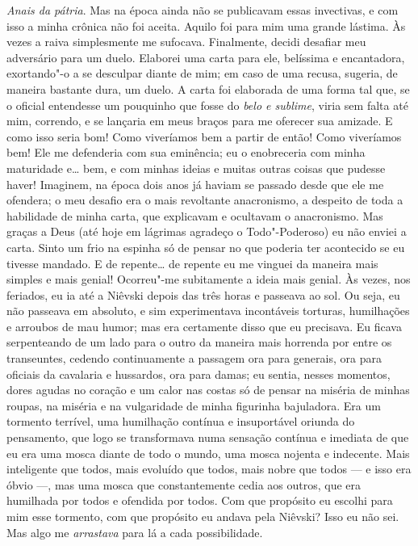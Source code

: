\textit{Anais da pátria}. Mas na época ainda não se publicavam essas
invectivas, e com isso a minha crônica não foi aceita.  Aquilo foi para mim uma
grande lástima. Às vezes a raiva simplesmente me sufocava. Finalmente, decidi
desafiar meu adversário para um duelo.  Elaborei uma carta para ele, belíssima
e encantadora, exortando"-o a se desculpar diante de mim; em caso de uma recusa,
sugeria, de maneira bastante dura, um duelo. A carta foi elaborada de uma forma
tal que, se o oficial entendesse um pouquinho que fosse do \textit{belo e sublime},
viria sem falta até mim, correndo, e se lançaria em meus braços para me
oferecer sua amizade. E como isso seria bom! Como viveríamos bem a partir de
então! Como viveríamos bem! Ele me defenderia com sua eminência; eu o
enobreceria com minha maturidade e\ldots{} bem, e com minhas ideias e muitas
outras coisas que pudesse haver! Imaginem, na época dois anos já haviam se
passado desde que ele me ofendera; o meu desafio era o mais revoltante
anacronismo, a despeito de toda a habilidade de minha carta, que explicavam e
ocultavam o anacronismo. Mas graças a Deus (até hoje em lágrimas agradeço o
Todo"-Poderoso) eu não enviei a carta. Sinto um frio na espinha só de pensar no
que poderia ter acontecido se eu tivesse mandado. E de repente\ldots{} de
repente eu me vinguei da maneira mais simples e mais genial! Ocorreu"-me
subitamente a ideia mais genial. Às vezes, nos feriados, eu ia até a Niêvski
depois das três horas e passeava ao sol. Ou seja, eu não passeava em absoluto,
e sim experimentava incontáveis torturas, humilhações e arroubos de mau humor;
mas era certamente disso que eu precisava. Eu ficava serpenteando de um lado
para o outro da maneira mais horrenda por entre os transeuntes, cedendo
continuamente a passagem ora para generais, ora para oficiais da cavalaria e
hussardos, ora para damas; eu sentia, nesses momentos, dores agudas no coração
e um calor nas costas só de pensar na miséria de minhas roupas, na miséria e na
vulgaridade de minha figurinha bajuladora. Era um tormento terrível, uma
humilhação contínua e insuportável oriunda do pensamento, que logo se
transformava numa sensação contínua e imediata de que eu era uma mosca diante
de todo o mundo, uma mosca nojenta e indecente. Mais inteligente que todos,
mais evoluído que todos, mais nobre que todos --- e isso era óbvio ---, mas uma
mosca que constantemente cedia aos outros, que era humilhada por todos e
ofendida por todos. Com que propósito eu escolhi para mim esse tormento, com
que propósito eu andava pela Niêvski? Isso eu não sei. Mas algo me
\textit{arrastava} para lá a cada possibilidade.

